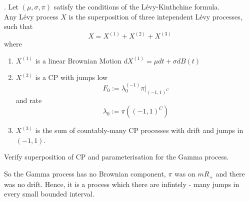 \documentclass[class=article,crop=false]{standalone}
\begin{document}
\begin{theorem}
	. Let $(\mu, \sigma, \pi)$ satisfy the conditions of the L\'evy-Kinthchine formula. \\
	Any L\'evy process $X$ is the superposition of three intependent L\'evy processes, such that 
	\begin{equation*}
		X = X^{(1)} + X^{(2)} + X^{(3)}
	\end{equation*}
	where 
	\begin{enumerate}
		\item $X^{(1)}$ is a linear Brownian Motion $dX^{(1)} = \mu dt + \sigma dB(t)$
		\item $X^{(2)}$ is a CP with jumps low
		\begin{equation*}
			F_0:=\lambda_0^{(-1)} \pi |_{(-1,1)^C}
		\end{equation*}
		and rate 
		\begin{equation*}
			\lambda_0 := \pi((-1,1)^C)
		\end{equation*}
		\item $X^{(3)}$ is the sum of countably-many CP processes with drift and jumps in $(-1,1)$. 
	\end{enumerate}
\end{theorem}
\begin{exercise}
	Verify superposition of CP and parameterisation for the Gamma process. 
\end{exercise}
 So the Gamma process has no Brownian component, $\pi$ was on $mR_+$ and there was no drift. Hence, it is a process which there are infintely - many jumps in every small bounded interval. \\
\end{document}
